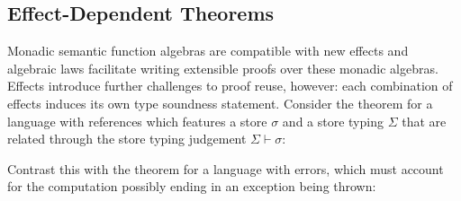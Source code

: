 
\subsection{Effect-Dependent Theorems}

Monadic semantic function algebras are compatible with new effects and
algebraic laws facilitate writing extensible proofs over these monadic
algebras. Effects introduce further challenges to proof reuse,
however: each combination of effects induces its own type soundness
statement. Consider the theorem for a language with references which
features a store $\sigma$ and a store typing $\Sigma$ that are related
through the store typing judgement $\Sigma \vdash \sigma$:


\vspace{2mm}
\noindent{}
\vspace{2mm}

\noindent Contrast this with the theorem for a language with errors,
which must account for the computation possibly ending in an exception
being thrown:

\vspace{2mm}
\noindent{}

